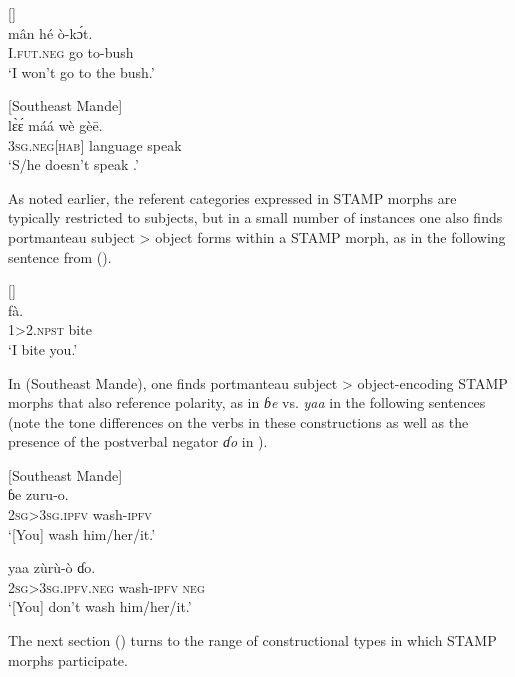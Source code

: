 \documentclass[output=paper]{langsci/langscibook}
\begin{document}
\ea\label{ex:anderson:6}
  \citep[13]{BendorSamuelEtAl1973}      []\\
\gll mân  hé  ò-k\'ɔt.  \\
\textsc{I.fut.neg}  go  to-bush\\
\glt `I won't go to the bush.'      
\z

\ea\label{ex:anderson:7}
 \citep[226]{Vydrine2009}           [Southeast Mande]\\
\gll l\`{ɛ}\'{ɛ}      máá    wè    gè\={e}.\\
\textsc{3sg.neg[hab]}      language  speak\\
\glt `S/he doesn't speak .'
\z

As noted earlier, the referent categories expressed in STAMP morphs are typically restricted to subjects, but in a small number of instances one also finds portmanteau subject > object forms within a STAMP morph, as in the following sentence from  ().

\ea\label{ex:anderson:8}
  \citep[355]{Cook1972}         []\\
    fà.\\
1>2.\textsc{npst}  bite\\
\glt `I bite you.'
\z

In  (Southeast Mande), one finds portmanteau subject > object-encoding STAMP morphs that also reference polarity, as in \textit{ɓ}\textit{e} vs. \textit{yaa} in the following sentences (note the tone differences on the verbs in these constructions as well as the presence of the postverbal negator \textit{ɗo} in ). 

\ea\label{ex:anderson:9}
\ea\label{ex:anderson:9a}
 \citep[239]{Vydrine2009}       [Southeast Mande]\\
\gll  ɓe      zuru-o.      \\
  \textsc{2sg>3sg.ipfv}    wash-\textsc{ipfv} \\
\glt `[You] wash him/her/it.'       

\ex \label{ex:anderson:9b}
\gll  yaa      zùrù-ò    ɗo.\\
  \textsc{2sg>3sg.ipfv.neg}  wash-\textsc{ipfv}  \textsc{neg}\\
\glt `[You] don't wash him/her/it.'
\z
\z

The next section () turns to the range of constructional types in which STAMP morphs participate.
\end{document}

